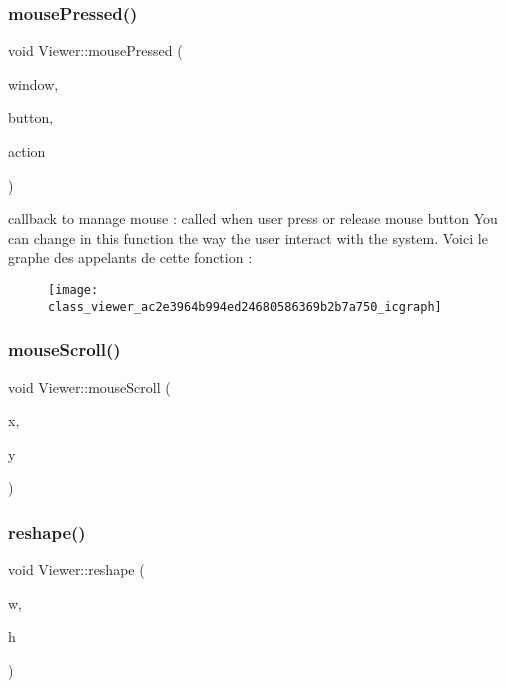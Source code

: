 \subsubsection{\texorpdfstring{mouse\+Pressed()}{mousePressed()}}
{\footnotesize\ttfamily void Viewer\+::mouse\+Pressed (\begin{DoxyParamCaption}\item[{G\+L\+F\+Wwindow $\ast$}]{window,  }\item[{int}]{button,  }\item[{int}]{action }\end{DoxyParamCaption})}

callback to manage mouse \+: called when user press or release mouse button You can change in this function the way the user interact with the system. Voici le graphe des appelants de cette fonction \+:\nopagebreak
\begin{figure}[H]
\begin{center}
\leavevmode
\texttt{[image: class\_viewer\_ac2e3964b994ed24680586369b2b7a750\_icgraph]}
\end{center}
\end{figure}
\mbox{\label{class_viewer_abd042d0aa5ae88ef0261d83c15ce8d4b}} 
\subsubsection{\texorpdfstring{mouse\+Scroll()}{mouseScroll()}}
{\footnotesize\ttfamily void Viewer\+::mouse\+Scroll (\begin{DoxyParamCaption}\item[{double}]{x,  }\item[{double}]{y }\end{DoxyParamCaption})}

\mbox{\label{class_viewer_ab4e8ad8f2d8c73cc9312785e6aed9e75}} 
\subsubsection{\texorpdfstring{reshape()}{reshape()}}
{\footnotesize\ttfamily void Viewer\+::reshape (\begin{DoxyParamCaption}\item[{int}]{w,  }\item[{int}]{h }\end{DoxyParamCaption})}



